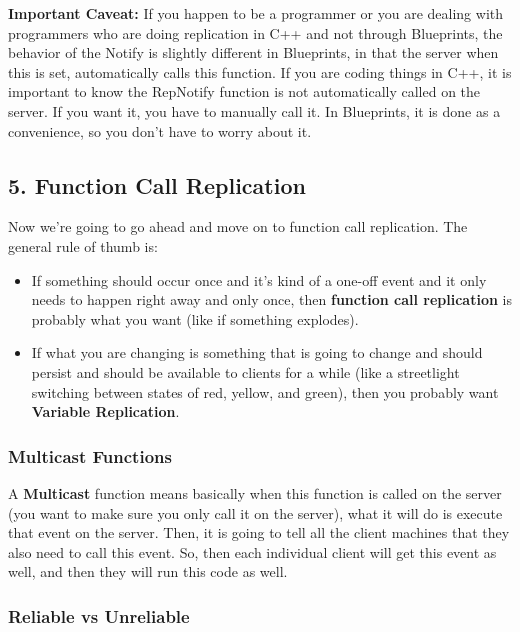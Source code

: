 \documentclass[
  letterpaper,
  DIV=11,
  numbers=noendperiod]{scrartcl}
\providecommand{\tightlist}{%
  \setlength{\itemsep}{0pt}\setlength{\parskip}{0pt}}
\begin{document}
\textbf{Important Caveat:} If you happen to be a programmer or you are
dealing with programmers who are doing replication in C++ and not
through Blueprints, the behavior of the Notify is slightly different in
Blueprints, in that the server when this is set, automatically calls
this function. If you are coding things in C++, it is important to know
the RepNotify function is not automatically called on the server. If you
want it, you have to manually call it. In Blueprints, it is done as a
convenience, so you don't have to worry about it.

\subsection{5. Function Call
Replication}\label{function-call-replication}

Now we're going to go ahead and move on to function call replication.
The general rule of thumb is:

\begin{itemize}
\tightlist
\item
  If something should occur once and it's kind of a one-off event and it
  only needs to happen right away and only once, then \textbf{function
  call replication} is probably what you want (like if something
  explodes).
\item
  If what you are changing is something that is going to change and
  should persist and should be available to clients for a while (like a
  streetlight switching between states of red, yellow, and green), then
  you probably want \textbf{Variable Replication}.
\end{itemize}

\subsubsection{Multicast Functions}\label{multicast-functions}

A \textbf{Multicast} function means basically when this function is
called on the server (you want to make sure you only call it on the
server), what it will do is execute that event on the server. Then, it
is going to tell all the client machines that they also need to call
this event. So, then each individual client will get this event as well,
and then they will run this code as well.

\subsubsection{Reliable vs Unreliable}\label{reliable-vs-unreliable}
\end{document}
